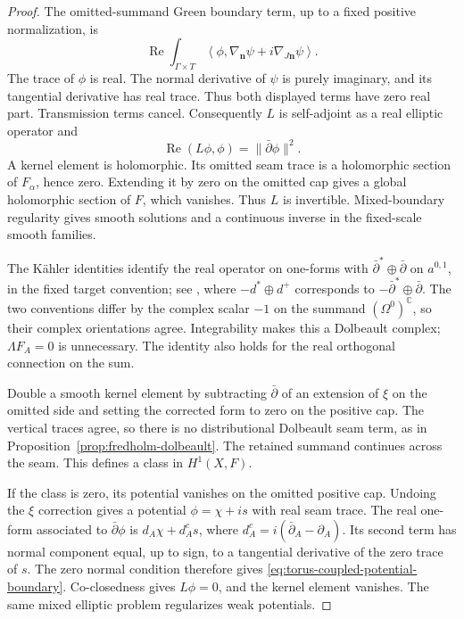 \documentclass[11pt]{amsart}
\theoremstyle{definition}
\theoremstyle{remark}
\theoremstyle{plain}
\newcommand{\CC}{\mathbb{C}}
\begin{document}
\begin{proof}
The omitted-summand Green boundary term,
up to a fixed positive normalization, is
\[
 \operatorname{Re}\int_{\Gamma\times T}
 \left\langle\phi,\nabla_{\mathbf n}\psi
                         +i\nabla_{J\mathbf n}\psi\right\rangle.
\]
The trace of $\phi$ is real. The normal
derivative of $\psi$ is purely imaginary,
and its tangential derivative has real
trace. Thus both displayed terms have zero
real part. Transmission terms cancel.
Consequently $L$ is self-adjoint as a real
elliptic operator and
\begin{equation}\label{eq:torus-coupled-potential-energy}
 \operatorname{Re}(L\phi,\phi)=\|\bar\partial\phi\|^2.
\end{equation}
A kernel element is holomorphic. Its omitted
seam trace is a holomorphic section of
$F_\alpha$, hence zero. Extending it by
zero on the omitted cap gives a global
holomorphic section of $F$, which vanishes.
Thus $L$ is invertible. Mixed-boundary
regularity gives smooth solutions and
a continuous inverse in the fixed-scale
smooth families.

The K\"ahler identities identify the real
operator on one-forms with
$\bar\partial^*\oplus\bar\partial$ on
$a^{0,1}$, in the fixed target convention;
see \cite[Section~3(c), pp.~412--413]{Donaldson87}, where
$-d^*\oplus d^+$ corresponds to $-\bar\partial^*\oplus\bar\partial$.
The two conventions differ by the complex scalar $-1$ on
the summand $(\Omega^0)^{\CC}$, so their complex
orientations agree.
Integrability makes this a Dolbeault
complex; $\Lambda F_A=0$ is unnecessary.
The identity also holds for the real
orthogonal connection on the sum.

Double a smooth kernel element by subtracting
$\bar\partial$ of an extension of $\xi$
on the omitted side and setting the corrected
form to zero on the positive cap. The
vertical traces agree, so there is no
distributional Dolbeault seam term, as in
Proposition~\ref{prop:fredholm-dolbeault}.
The retained summand continues across
the seam. This defines a class in $H^1(X,F)$.

If the class is zero, its potential vanishes
on the omitted positive cap. Undoing the
$\xi$ correction gives a potential
$\phi=\chi+i s$ with real seam trace.
The real one-form associated to
$\bar\partial\phi$ is $d_A\chi+d_A^c s$,
where $d_A^c=i(\bar\partial_A-\partial_A)$.
Its second term has normal component
equal, up to sign, to a tangential
derivative of the zero trace of $s$.
The zero normal condition therefore gives
\eqref{eq:torus-coupled-potential-boundary}.
Co-closedness gives $L\phi=0$, and the
kernel element vanishes. The same mixed
elliptic problem regularizes weak potentials.


\end{proof}
\end{document}
